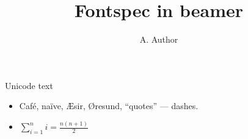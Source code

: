 \documentclass{beamer}
\title{Fontspec in beamer}
\author{A. Author}
\date{}
\begin{document}
\frame{\titlepage}
\begin{frame}{Unicode text}
\begin{itemize}
\item<1-> Café, naïve, Æsir, Øresund, “quotes” — dashes.
\item<2-> $\sum_{i=1}^n i = \frac{n(n+1)}{2}$
\end{itemize}
\end{frame}
\end{document}
